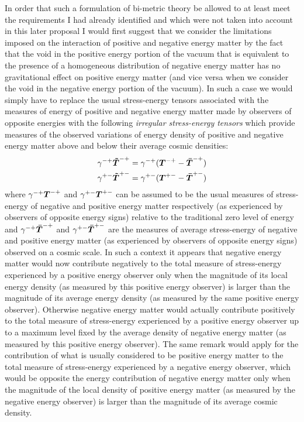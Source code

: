\documentclass[notitlepage,12pt]{report}
\newcommand{\bm}[1]{\mbox{\boldmath $#1$}}
\begin{document}
In order that such a formulation of bi-metric theory be allowed to at least meet the requirements I had already identified and which were not taken into account in this later proposal I would first suggest that we consider the limitations imposed on the interaction of positive and negative energy matter by the fact that the void in the positive energy portion of the vacuum that is equivalent to the presence of a homogeneous distribution of negative energy matter has no gravitational effect on positive energy matter (and vice versa when we consider the void in the negative energy portion of the vacuum). In such a case we would simply have to replace the usual stress-energy tensors associated with the measures of energy of positive and negative energy matter made by observers of opposite energies with the following \textit{irregular stress-energy tensors} which provide measures of the observed variations of energy density of positive and negative energy matter above and below their average cosmic densities:
\begin{eqnarray}\label{eq:2.8}
\gamma^{-+}\bm{\tilde{T}}^{-+}=\gamma^{-+}(\bm{T}^{-+}-\bm{\bar{T}}^{-+}) \\
\gamma^{+-}\bm{\tilde{T}}^{+-}=\gamma^{+-}(\bm{T}^{+-}-\bm{\bar{T}}^{+-}) \nonumber
\end{eqnarray}
where $\gamma^{-+}\bm{T}^{-+}$ and $\gamma^{+-}\bm{T}^{+-}$ can be assumed to be the usual measures of stress-energy of negative and positive energy matter respectively (as experienced by observers of opposite energy signs) relative to the traditional zero level of energy and $\gamma^{-+}\bm{\bar{T}}^{-+}$ and $\gamma^{+-}\bm{\bar{T}}^{+-}$ are the measures of average stress-energy of negative and positive energy matter (as experienced by observers of opposite energy signs) observed on a cosmic scale. In such a context it appears that negative energy matter would now contribute negatively to the total measure of stress-energy experienced by a positive energy observer only when the magnitude of its local energy density (as measured by this positive energy observer) is larger than the magnitude of its average energy density (as measured by the same positive energy observer). Otherwise negative energy matter would actually contribute positively to the total measure of stress-energy experienced by a positive energy observer up to a maximum level fixed by the average density of negative energy matter (as measured by this positive energy observer). The same remark would apply for the contribution of what is usually considered to be positive energy matter to the total measure of stress-energy experienced by a negative energy observer, which would be opposite the energy contribution of negative energy matter only when the magnitude of the local density of positive energy matter (as measured by the negative energy observer) is larger than the magnitude of its average cosmic density.
\end{document}
